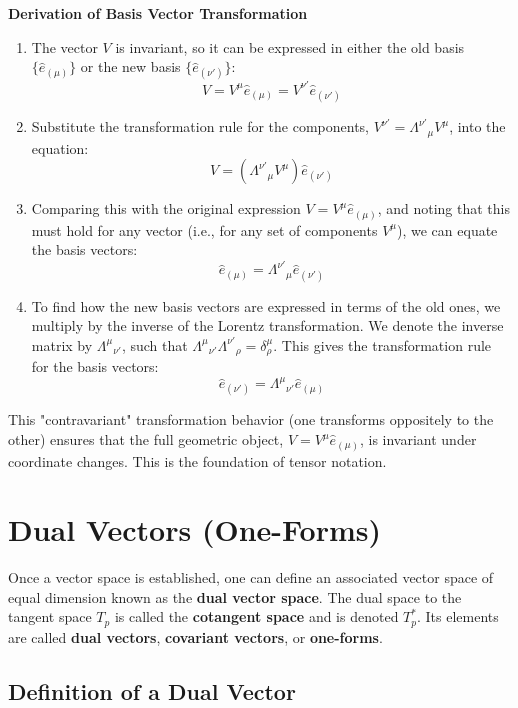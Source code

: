 \documentclass[11pt, a4paper]{report}
\begin{document}
\textbf{Derivation of Basis Vector Transformation}
\begin{enumerate}
    \item The vector $V$ is invariant, so it can be expressed in either the old basis $\{\hat{e}_{(\mu)}\}$ or the new basis $\{\hat{e}_{(\nu')}\}$:
    \[
        V = V^\mu \hat{e}_{(\mu)} = V^{\nu'} \hat{e}_{(\nu')}
    \]
    \item Substitute the transformation rule for the components, $V^{\nu'} = {\Lambda^{\nu'}}_\mu V^\mu$, into the equation:
    \[
        V = ({\Lambda^{\nu'}}_\mu V^\mu) \hat{e}_{(\nu')}
    \]
    \item Comparing this with the original expression $V = V^\mu \hat{e}_{(\mu)}$, and noting that this must hold for any vector (i.e., for any set of components $V^\mu$), we can equate the basis vectors:
    \[
        \hat{e}_{(\mu)} = {\Lambda^{\nu'}}_\mu \hat{e}_{(\nu')}
    \]
    \item To find how the new basis vectors are expressed in terms of the old ones, we multiply by the inverse of the Lorentz transformation. We denote the inverse matrix by ${\Lambda^\mu}_{\nu'}$, such that ${\Lambda^\mu}_{\nu'} {\Lambda^{\nu'}}_\rho = \delta^\mu_\rho$. This gives the transformation rule for the basis vectors:
    \begin{equation}
        \hat{e}_{(\nu')} = {\Lambda^\mu}_{\nu'} \hat{e}_{(\mu)}
    \end{equation}
\end{enumerate}


This "contravariant" transformation behavior (one transforms oppositely to the other) ensures that the full geometric object, $V = V^\mu \hat{e}_{(\mu)}$, is invariant under coordinate changes. This is the foundation of tensor notation.

\section{Dual Vectors (One-Forms)}

Once a vector space is established, one can define an associated vector space of equal dimension known as the \textbf{dual vector space}. The dual space to the tangent space $T_p$ is called the \textbf{cotangent space} and is denoted $T_p^*$. Its elements are called \textbf{dual vectors}, \textbf{covariant vectors}, or \textbf{one-forms}.

\subsection*{Definition of a Dual Vector}
\end{document}
